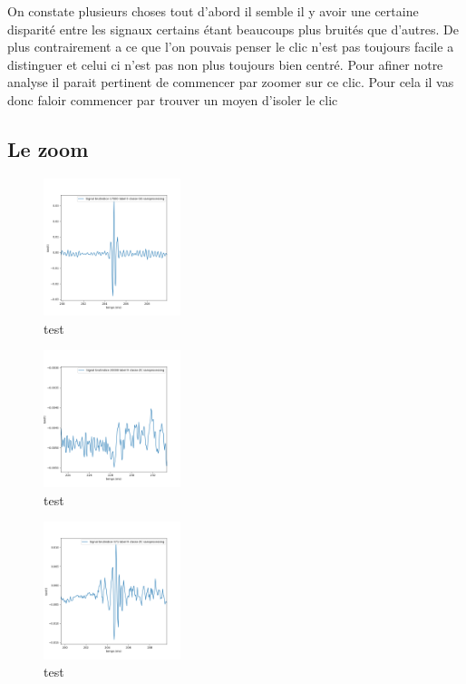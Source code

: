 On constate plusieurs choses tout d'abord il semble il y avoir une certaine disparité entre les signaux certains étant beaucoups plus bruités que d'autres. De plus contrairement a ce que l'on pouvais penser le clic n'est pas toujours facile a distinguer et celui ci n'est pas non plus toujours bien centré. Pour afiner notre analyse il parait pertinent de commencer par zoomer sur ce clic.
Pour cela il vas donc faloir commencer par trouver un moyen d'isoler le clic

\subsection{Le zoom}


\begin{figure}[!h]
\centering
\includegraphics[width=4cm]{./images/indice17000Spectro1Dlabel0classeGGsansprocessingaveczoom.png}
\caption{test}
\end{figure}


\begin{figure}[!h]
\centering
\includegraphics[width=4cm]{./images/indice20000Spectro1Dlabel9classeZCsansprocessingaveczoom.png}
\caption{test}
\end{figure}

\begin{figure}[!h]
\centering
\includegraphics[width=4cm]{./images/indice571Spectro1Dlabel9classeZCsansprocessingaveczoom.png}
\caption{test}
\end{figure}


